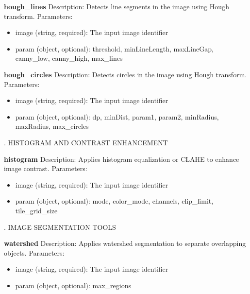 \documentclass[runningheads]{llncs}
\begin{document}
\begin{tcolorbox}
\noindent \textbf{hough\_lines}
\newline Description: Detects line segments in the image using Hough transform.
\newline Parameters:
\begin{itemize}
    \item image (string, required): The input image identifier
    \item param (object, optional): threshold, minLineLength, maxLineGap, canny\_low, canny\_high, max\_lines
\end{itemize}

\noindent \textbf{hough\_circles}
\newline Description: Detects circles in the image using Hough transform.
\newline Parameters:
\begin{itemize}
    \item image (string, required): The input image identifier
    \item param (object, optional): dp, minDist, param1, param2, minRadius, maxRadius, max\_circles
\end{itemize}

\vspace{4mm}
. HISTOGRAM AND CONTRAST ENHANCEMENT
\vspace{2mm}

\noindent \textbf{histogram}
\newline Description: Applies histogram equalization or CLAHE to enhance image contrast.
\newline Parameters:
\begin{itemize}
    \item image (string, required): The input image identifier
    \item param (object, optional): mode, color\_mode, channels, clip\_limit, tile\_grid\_size
\end{itemize}

\vspace{4mm}
. IMAGE SEGMENTATION TOOLS
\vspace{2mm}

\noindent \textbf{watershed}
\newline Description: Applies watershed segmentation to separate overlapping objects.
\newline Parameters:
\begin{itemize}
    \item image (string, required): The input image identifier
    \item param (object, optional): max\_regions
\end{itemize}


\end{tcolorbox}
\end{document}
